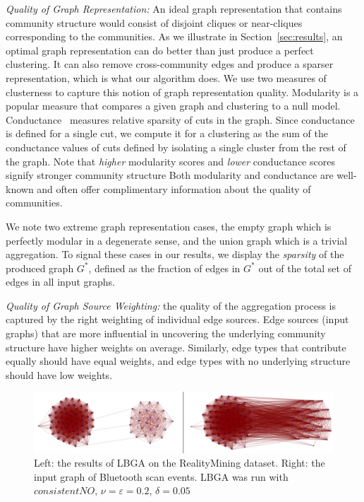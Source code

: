 \documentclass{article}
\begin{document}
{\em Quality of Graph Representation:} An ideal graph representation that
contains community structure would consist of disjoint cliques or near-cliques
corresponding to the communities. As we illustrate in
Section~\ref{sec:results}, an optimal graph representation can do better than
just produce a perfect clustering. It can also remove cross-community edges and
produce a sparser representation, which is what our algorithm does. We use two
measures of clusterness to capture this notion of graph representation quality.
Modularity \cite{Newman06} is a popular measure that compares a given graph and
clustering to a null model. Conductance~\cite{Leskovec2008,Gleich2012} measures
relative sparsity of cuts in the graph. Since conductance is defined for a
single cut, we compute it for a clustering as the sum of the conductance values
of cuts defined by isolating a single cluster from the rest of the graph. Note
that \emph{higher} modularity scores and \emph{lower} conductance scores
signify stronger community structure Both modularity and conductance are
well-known and often offer complimentary information about the quality of
communities.
 
We note two extreme graph representation cases, the empty graph which is
perfectly modular in a degenerate sense, and the union graph which is a trivial
aggregation. To signal these cases in our results, we display the
\emph{sparsity} of the produced graph $G^*$, defined as the fraction of edges
in $G^*$ out of the total set of edges in all input graphs. 

{\em Quality of Graph Source Weighting:} the quality of the aggregation process
is captured by the right weighting of individual edge sources. Edge sources (input
graphs) that are more influential in uncovering the underlying community
structure have higher weights on average. Similarly, edge types that contribute
equally should have equal weights, and edge types with no underlying structure
should have low weights.


\begin{figure}[t]
\begin{centering}
\includegraphics[width=\columnwidth]{reality-mining-comparison.pdf}
\par\end{centering}
\caption{Left: the results of LBGA on the RealityMining dataset. Right: the
input graph of Bluetooth scan events. LBGA was run with $consistentNO$, $\nu =
\varepsilon = 0.2$, $\delta = 0.05$} 
\label{fig:reality-mining-comparison}
\end{figure}
\end{document}

